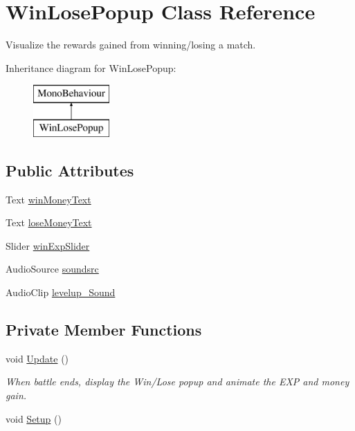 \hypertarget{class_win_lose_popup}{}\section{Win\+Lose\+Popup Class Reference}
\label{class_win_lose_popup}


Visualize the rewards gained from winning/losing a match.  


Inheritance diagram for Win\+Lose\+Popup\+:\begin{figure}[H]
\begin{center}
\leavevmode
\includegraphics[height=2.000000cm]{class_win_lose_popup}
\end{center}
\end{figure}
\subsection*{Public Attributes}
\begin{DoxyCompactItemize}
\item 
Text \mbox{\hyperlink{class_win_lose_popup_a96b5a5d480b14cdae7e5a882bee30757}{win\+Money\+Text}}
\item 
Text \mbox{\hyperlink{class_win_lose_popup_adbe5b4c1578b28ae3a6bc4993407a739}{lose\+Money\+Text}}
\item 
Slider \mbox{\hyperlink{class_win_lose_popup_a68c25472f6b7101d6995dd57b6aa6803}{win\+Exp\+Slider}}
\item 
Audio\+Source \mbox{\hyperlink{class_win_lose_popup_a7f104ba616010ea3714c5abc1306e6de}{soundsrc}}
\item 
Audio\+Clip \mbox{\hyperlink{class_win_lose_popup_a1f35c7e6dea70e8dba042d4703768d8d}{levelup\+\_\+\+Sound}}
\end{DoxyCompactItemize}
\subsection*{Private Member Functions}
\begin{DoxyCompactItemize}
\item 
void \mbox{\hyperlink{class_win_lose_popup_a9f1909bfd129a06cb0ff7048ccf19d0f}{Update}} ()
\begin{DoxyCompactList}\small\item\em When battle ends, display the Win/\+Lose popup and animate the E\+XP and money gain. \end{DoxyCompactList}\item 
void \mbox{\hyperlink{class_win_lose_popup_a93530da059106189d5c41afff35bca9d}{Setup}} ()
\end{DoxyCompactItemize}

